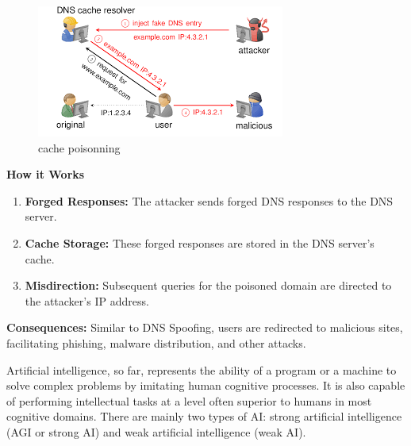 \begin{figure}[ht!]
	\centering
	\includegraphics[width=0.5\linewidth]{chap1/images/cache poisning.png}
	\caption{cache poisonning\cite{datadog2023dns}}
	\label{fig:enter-label}
\end{figure}
\textbf{How it Works\\}
\begin{enumerate}
	\item \textbf{Forged Responses:} The attacker sends forged DNS responses to the DNS server.
	\item \textbf{Cache Storage:} These forged responses are stored in the DNS server's cache.
	\item \textbf{Misdirection:} Subsequent queries for the poisoned domain are directed to the attacker's IP address.
\end{enumerate}
\textbf{Consequences:}
Similar to DNS Spoofing, users are redirected to malicious sites, facilitating phishing, malware distribution, and other attacks.



Artificial intelligence, so far, represents the ability of a program or a machine to solve complex problems by imitating human cognitive processes. It is also capable of performing intellectual tasks at a level often superior to humans in most cognitive domains. There are mainly two types of AI: strong artificial intelligence (AGI or strong AI) and weak artificial intelligence (weak AI).




